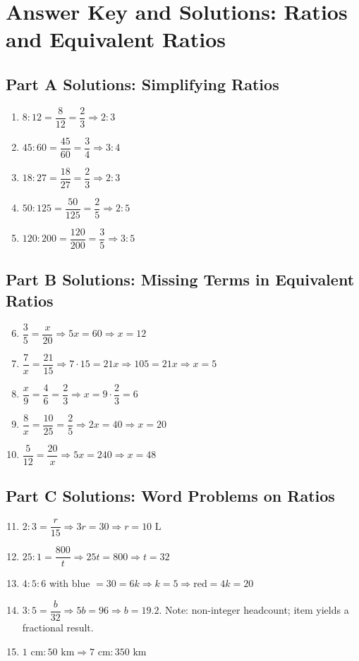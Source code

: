 \documentclass[12pt]{article}
\begin{document}
\section*{Answer Key and Solutions: Ratios and Equivalent Ratios}

\subsection*{Part A Solutions: Simplifying Ratios}
\begin{enumerate}
  \item \(8:12 = \dfrac{8}{12}=\dfrac{2}{3} \Rightarrow \boxed{2:3}\)
  \item \(45:60 = \dfrac{45}{60}=\dfrac{3}{4} \Rightarrow \boxed{3:4}\)
  \item \(18:27 = \dfrac{18}{27}=\dfrac{2}{3} \Rightarrow \boxed{2:3}\)
  \item \(50:125 = \dfrac{50}{125}=\dfrac{2}{5} \Rightarrow \boxed{2:5}\)
  \item \(120:200 = \dfrac{120}{200}=\dfrac{3}{5} \Rightarrow \boxed{3:5}\)
\end{enumerate}

\subsection*{Part B Solutions: Missing Terms in Equivalent Ratios}
\begin{enumerate}
  \setcounter{enumi}{5}
  \item \(\dfrac{3}{5}=\dfrac{x}{20} \Rightarrow 5x=60 \Rightarrow \boxed{x=12}\)
  \item \(\dfrac{7}{x}=\dfrac{21}{15} \Rightarrow 7\cdot15=21x \Rightarrow 105=21x \Rightarrow \boxed{x=5}\)
  \item \(\dfrac{x}{9}=\dfrac{4}{6}=\dfrac{2}{3} \Rightarrow x=9\cdot\dfrac{2}{3}=\boxed{6}\)
  \item \(\dfrac{8}{x}=\dfrac{10}{25}=\dfrac{2}{5} \Rightarrow 2x=40 \Rightarrow \boxed{x=20}\)
  \item \(\dfrac{5}{12}=\dfrac{20}{x} \Rightarrow 5x=240 \Rightarrow \boxed{x=48}\)
\end{enumerate}

\subsection*{Part C Solutions: Word Problems on Ratios}
\begin{enumerate}
  \setcounter{enumi}{10}
  \item \(2:3=\dfrac{r}{15} \Rightarrow 3r=30 \Rightarrow \boxed{r=10\text{ L}}\)
  \item \(25:1=\dfrac{800}{t} \Rightarrow 25t=800 \Rightarrow \boxed{t=32}\)
  \item \(4:5:6\) with blue \(=30=6k \Rightarrow k=5 \Rightarrow \boxed{\text{red}=4k=20}\)
  \item \(3:5=\dfrac{b}{32} \Rightarrow 5b=96 \Rightarrow b=19.2\). Note: non-integer headcount; item yields a fractional result.
  \item \(1\text{ cm}:50\text{ km} \Rightarrow 7\text{ cm}: \boxed{350\text{ km}}\)
\end{enumerate}
\end{document}
